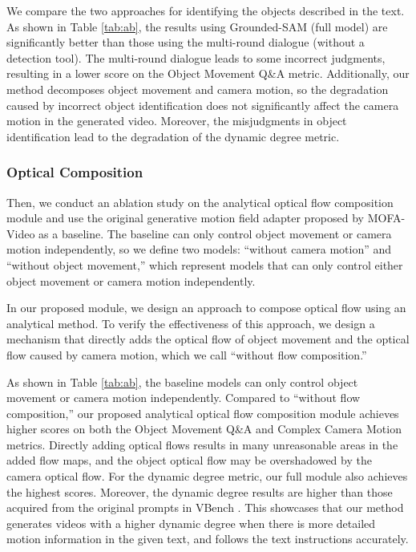 We compare the two approaches for identifying the objects described in the text. As shown in Table \ref{tab:ab}, the results using Grounded-SAM (full model) are significantly better than those using the multi-round dialogue (without a detection tool). The multi-round dialogue leads to some incorrect judgments, resulting in a lower score on the Object Movement Q\&A metric. Additionally, our method decomposes object movement and camera motion, so the degradation caused by incorrect object identification does not significantly affect the camera motion in the generated video. Moreover, the misjudgments in object identification lead to the degradation of the dynamic degree metric.

\subsubsection{Optical Composition}
Then, we conduct an ablation study on the analytical optical flow composition module and use the original generative motion field adapter proposed by MOFA-Video \cite{niu2024mofa} as a baseline. The baseline can only control object movement or camera motion independently, so we define two models: “without camera motion” and “without object movement,” which represent models that can only control either object movement or camera motion independently.

In our proposed module, we design an approach to compose optical flow using an analytical method. To verify the effectiveness of this approach, we design a mechanism that directly adds the optical flow of object movement and the optical flow caused by camera motion, which we call “without flow composition.”

As shown in Table \ref{tab:ab}, the baseline models can only control object movement or camera motion independently. Compared to “without flow composition,” our proposed analytical optical flow composition module achieves higher scores on both the Object Movement Q\&A and Complex Camera Motion metrics. Directly adding optical flows results in many unreasonable areas in the added flow maps, and the object optical flow may be overshadowed by the camera optical flow. For the dynamic degree metric, our full module also achieves the highest scores. Moreover, the dynamic degree results are higher than those acquired from the original prompts in VBench \cite{huang2024vbench}. This showcases that our method generates videos with a higher dynamic degree when there is more detailed motion information in the given text, and follows the text instructions accurately.
